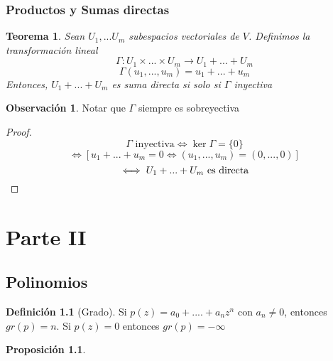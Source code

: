 \documentclass[11pt]{book}
\newtheorem{thm}{Teorema}[section]
\newtheorem{prop}[thm]{Proposición}
\theoremstyle{definition}
\newtheorem{defn}{Definición}[section]
\newtheorem{obs}{Observación}[section]
\begin{document}
\subsection{Productos y Sumas directas}
\begin{thm}
	Sean $U_1,...U_m$ subespacios vectoriales de $V$. Definimos la transformación lineal
	\[\Gamma:U_1\times...\times U_m\rightarrow U_1+...+U_m\]
	\[\Gamma(u_1,...,u_m)=u_1+...+u_m\]
	Entonces, $U_1+...+U_m$ es suma directa si solo si $\Gamma$ inyectiva
\end{thm}
\begin{obs}
	Notar que $\Gamma$ siempre es sobreyectiva
\end{obs}
\begin{proof}
	\[\Gamma\textrm{ inyectiva} \iff\ker\Gamma=\{0\}\]
	\[\iff [u_1+...+u_m=0\iff(u_1,...,u_m)=(0,...,0)]\]
	\[\iff U_1+...+U_m\textrm{ es directa}\qedhere\]
\end{proof}

\chapter{Parte II}
\section{Polinomios}
\begin{defn}[Grado]
	Si $p(z)=a_0+....+a_nz^n$ con $a_n\neq 0$, entonces $gr(p)=n$. Si $p(z)=0$ entonces $gr(p)=-\infty$
\end{defn}
\begin{prop}

\end{prop}
\end{document}
